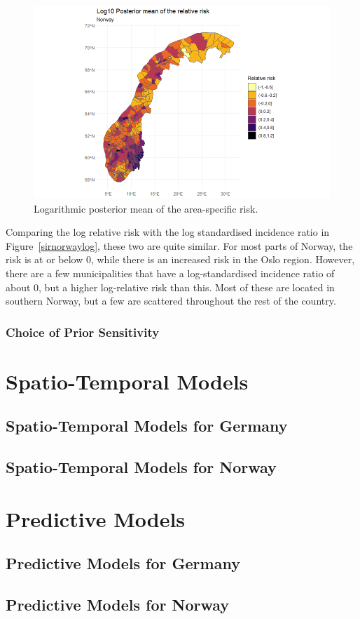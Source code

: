 \begin{figure}[H]
    \centering
    \includegraphics[width = \textwidth]{posterior_norway_log.png}
    \caption{Logarithmic posterior mean of the area-specific risk.}
    \label{posteriorNorwayLog}
\end{figure}
%     
Comparing the log relative risk with the log standardised incidence ratio in Figure~\ref{sirnorwaylog}, these two are quite similar. For most parts of Norway, the risk is at or below 0, while there is an increased risk in the Oslo region. However, there are a few municipalities that have a log-standardised incidence ratio of about 0, but a higher log-relative risk than this. Most of these are located in southern Norway, but a few are scattered throughout the rest of the country.
\clearpage
\subsubsection{Choice of Prior Sensitivity}
\section{Spatio-Temporal Models}
\subsection{Spatio-Temporal Models for Germany}
\subsection{Spatio-Temporal Models for Norway}
\section{Predictive Models}
\subsection{Predictive Models for Germany}
\subsection{Predictive Models for Norway}